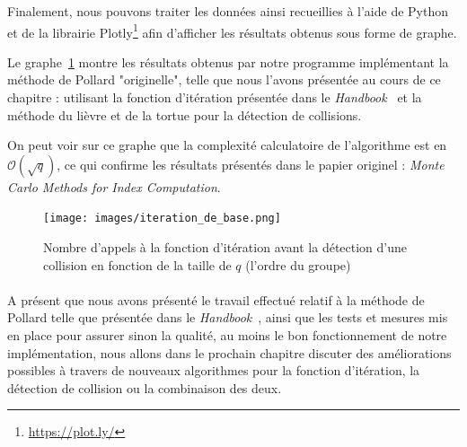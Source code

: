       Finalement, nous pouvons traiter les données ainsi recueillies à l'aide de Python et de la librairie Plotly\footnote{\url{https://plot.ly/}} afin d'afficher les résultats obtenus sous forme de graphe.

      Le graphe~\ref{fig:basic_iteration_results} montre les résultats obtenus par notre programme implémentant la méthode de Pollard "originelle", telle que nous l'avons présentée au cours de ce chapitre : utilisant la fonction d'itération présentée dans le \textit{Handbook}~\autocite[107]{handbook} et la méthode du lièvre et de la tortue pour la détection de collisions.

      On peut voir sur ce graphe que la complexité calculatoire de l'algorithme est en $\mathcal{O}(\sqrt{q})$, ce qui confirme les résultats présentés dans le papier originel : \textit{Monte Carlo Methods for Index Computation}\autocite{pollard0}.

      \begin{figure}
        \center{}
        \texttt{[image: images/iteration\_de\_base.png]}
        \caption{Nombre d'appels à la fonction d'itération avant la détection d'une collision en fonction de la taille de $q$ (l'ordre du groupe)}
        \label{fig:basic_iteration_results}
      \end{figure}


    \paragraph{}
    A présent que nous avons présenté le travail effectué relatif à la méthode de Pollard telle que présentée dans le \textit{Handbook}~\autocite[106]{handbook}, ainsi que les tests et mesures mis en place pour assurer sinon la qualité, au moins le bon fonctionnement de notre implémentation, nous allons dans le prochain chapitre discuter des améliorations possibles à travers de nouveaux algorithmes pour la fonction d'itération, la détection de collision ou la combinaison des deux.
